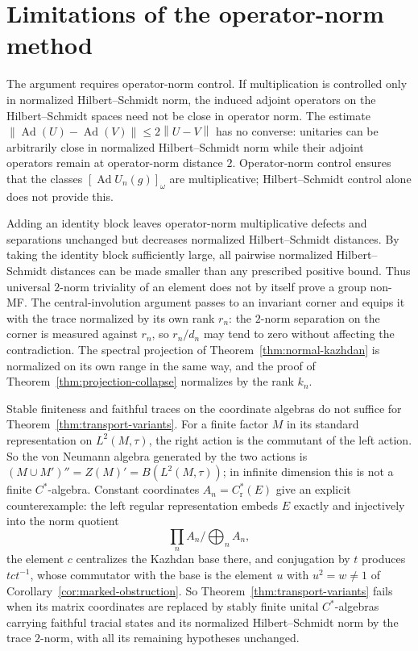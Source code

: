 \documentclass[11pt]{amsart}
\newcommand{\leanverified}[2]{\ignorespaces}
\theoremstyle{definition}
\theoremstyle{remark}
\theoremstyle{plain}
\newcommand{\Ad}{\operatorname{Ad}}
\newcommand{\Cred}{C^*_{\mathrm r}}
\newcommand{\opnorm}[1]{\left\lVert #1\right\rVert}
\begin{document}
\section{Limitations of the operator-norm method}\label{sec:limits}

The argument requires operator-norm control.  If multiplication is
controlled only in normalized Hilbert--Schmidt norm, the induced adjoint
operators on the Hilbert--Schmidt spaces need not be close in operator norm.
The estimate $\opnorm{\Ad(U)-\Ad(V)}\le2\opnorm{U-V}$ has no converse:
unitaries can be arbitrarily close in normalized Hilbert--Schmidt norm while
their adjoint operators remain at operator-norm distance $2$.
Operator-norm control ensures that the classes
$[\Ad U_n(g)]_\omega$ are multiplicative; Hilbert--Schmidt control
alone does not provide this.
\leanverified{Sofic/HilbertSchmidtAdjointGap}{GroupApproximation.HilbertSchmidtAdjointGap.exists_hsClose_adjointFar}

Adding an identity block leaves operator-norm multiplicative defects
and separations unchanged but decreases normalized Hilbert--Schmidt
distances.  By taking the identity block sufficiently large, all
pairwise normalized Hilbert--Schmidt distances can be made smaller
than any prescribed positive bound.
\leanverified{Sofic/NormTraceGap}{GroupApproximation.NormModel.exists_hs_collapse}
Thus universal $2$-norm triviality of an element does not by itself prove a
group non-MF\@.  The central-involution argument passes to an
invariant corner and equips it with the trace normalized by its own
rank $r_n$: the $2$-norm separation on the corner is measured against
$r_n$, so $r_n/d_n$ may tend to zero without
affecting the contradiction.
The spectral projection of Theorem~\ref{thm:normal-kazhdan} is
normalized on its own range in the same way, and the proof of
Theorem~\ref{thm:projection-collapse} normalizes by the rank $k_n$.

Stable finiteness and faithful traces on the coordinate algebras do
not suffice for Theorem~\ref{thm:transport-variants}.  For a finite
factor $M$ in its standard representation on $L^2(M,\tau)$, the right
action is the commutant of the left action.  So the von Neumann
algebra generated by the two actions is
$(M\cup M')''=Z(M)'=B(L^2(M,\tau))$; in infinite dimension this is not
a finite $C^*$-algebra.  Constant coordinates
$A_n=\Cred(E)$ give an explicit counterexample: the left regular
representation embeds $E$ exactly and injectively into the norm
quotient
\[
 \textstyle\prod_nA_n\big/\bigoplus_nA_n ,
\]
the element $c$ centralizes the Kazhdan base there, and conjugation by
$t$ produces $tct^{-1}$, whose commutator with the base is the element
$u$ with $u^2=w\ne1$ of Corollary~\ref{cor:marked-obstruction}.
\leanverified{Sofic/FaithfullyTracedCoordinateNoGo}{GroupApproximation.FaithfullyTracedCoordinates.manuscriptFaithfullyTracedCoordinateNoGo}
So Theorem~\ref{thm:transport-variants} fails when its matrix
coordinates are replaced by stably finite unital $C^*$-algebras
carrying faithful tracial states and its normalized Hilbert--Schmidt
norm by the trace $2$-norm, with all its remaining hypotheses
unchanged.
\end{document}
